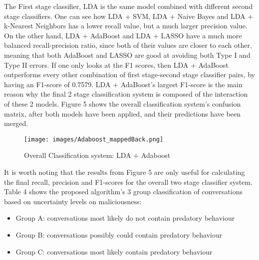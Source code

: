 \documentclass[11pt]{article}
\begin{document}
The First stage classifier, LDA is the same model combined with different second stage classifiers. One can see how LDA + SVM, LDA + Naive Bayes and LDA + k-Nearest Neighbors has a lower recall value, but a much larger precision value. On the other hand, LDA + AdaBoost and LDA + LASSO have a much more balanced recall-precision ratio, since both of their values are closer to each other, meaning that both AdaBoost and LASSO are good at avoiding both Type I and Type II errors. If one only looks at the F1 scores, then LDA + AdaBoost outperforms every other combination of first stage-second stage classifier pairs, by having an F1-score of 0.7579. LDA + AdaBoost's largest F1-score is the main reason why the final 2 stage classification  system is composed of the interaction of these 2 models. Figure 5 shows the overall classification system's confusion matrix, after both models have been applied, and their predictions have been merged.

\begin{figure}[h!]
    \centering
    \texttt{[image: images/Adaboost\_mappedBack.png]}
    \caption{Overall Classification system: LDA + Adaboost}
    \label{fig:word2vec}
\end{figure}

It is worth noting that the results from Figure 5 are only useful for calculating the final recall, precision and F1-scores for the overall two stage classifier system. Table 4 shows the proposed algorithm's 3 group classification of conversations based on uncertainty levels on maliciousness:
\begin{itemize}
        \item Group A: conversations most likely do not contain predatory behaviour
        \item Group B: conversations possibly could contain predatory behaviour
        \item Group C: conversations most likely contain predatory behaviour
\end{itemize}
\end{document}
